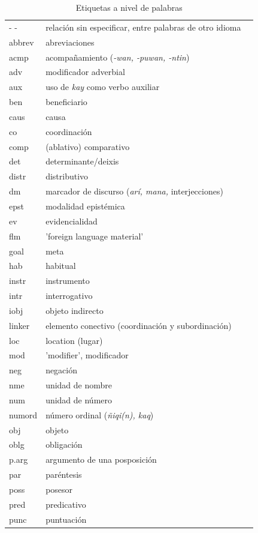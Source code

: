 \documentclass[a4paper,11pt,DIV12]{scrartcl}
\begin{document}
\begin{table}
\caption{Etiquetas a nivel de palabras}
\begin{center}
  \begin{tabular}{lll}
\toprule
- - & relaci\'on sin especificar, entre palabras de otro idioma\\
abbrev & abreviaciones\\
acmp & acompa\~namiento ({\em -wan, -puwan, -ntin})\\
adv & modificador adverbial\\
aux & uso de {\em kay} como verbo auxiliar\\
ben & beneficiario\\
caus & causa \\
co & coordinaci\'on\\
comp & (ablativo) comparativo\\
det & determinante/deixis\\
distr & distributivo\\
dm & marcador de discurso ({\em ar\'i, mana,} interjecciones)\\
epst & modalidad epist\'emica\\
ev & evidencialidad\\
flm & 'foreign language material'\\
goal & meta\\
hab & habitual\\
instr & instrumento\\
intr & interrogativo\\
iobj & objeto indirecto \\
linker & elemento conectivo (coordinaci\'on y subordinaci\'on)\\
loc & location (lugar)\\
mod & 'modifier', modificador\\
neg & negaci\'on\\
nme & unidad de nombre \\
num & unidad de n\'umero\\
numord & n\'umero ordinal ({\em \~niqi(n), kaq})\\
obj & objeto \\
oblg & obligaci\'on \\
p.arg & argumento de una posposici\'on\\
par & par\'entesis\\
poss & posesor \\
pred & predicativo\\
punc & puntuaci\'on\\

\end{tabular}
\end{center}
\end{table}
\end{document}
